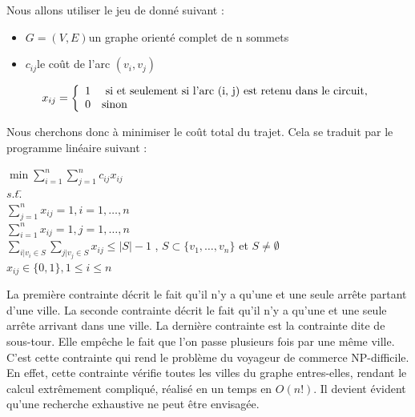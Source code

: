 \documentclass{article}
\begin{document}
Nous allons utiliser le jeu de donné suivant :\newline
\begin{itemize}
\item{$G = (V, E)$}{un graphe orienté complet de n sommets}
\item{$c_{ij}$}{le coût de l'arc $(v_{i}, v_{j})$}
\end{itemize}

\[ x_{ij} = \left\{
\begin{array}{l l}
	1 \quad $ si et seulement si l'arc (i, j) est retenu dans le circuit,$\\
	0 \quad $sinon$
\end{array} \right.\]

Nous cherchons donc à minimiser le coût total du trajet. Cela se traduit par le programme linéaire suivant :

\begin{tabbing}
$\min\sum_{i=1}^{n}\sum_{j=1}^{n}c_{ij}x_{ij}$\\
$s.t.$\=
\+\\
$\sum_{j=1}^{n}x_{ij} = 1, i = 1,\dots, n$\\
$\sum_{i=1}^{n}x_{ij} = 1, j = 1,\dots, n$\\
$\sum_{i|v_{i} \in S}\sum_{j|v_{j} \in S}x_{ij} \leq |S| - 1$ , $S \subset \{v_{1},\dots, v_{n}\}$ et $S \neq \emptyset$\\
$x_{ij} \in \{0,1\}, 1 \leq i \leq n$
\end{tabbing}

La première contrainte décrit le fait qu'il n'y a qu'une et une seule arrête partant d'une ville.
La seconde contrainte décrit le fait qu'il n'y a qu'une et une seule arrête arrivant dans une ville.
La dernière contrainte est la contrainte dite de sous-tour.
Elle empêche le fait que l'on passe plusieurs fois par une même ville.
C'est cette contrainte qui rend le problème du voyageur de commerce NP-difficile.
En effet, cette contrainte vérifie toutes les villes du graphe entres-elles, rendant le calcul extrêmement compliqué, réalisé en un temps en $O(n!)$.
Il devient évident qu'une recherche exhaustive ne peut être envisagée.
\end{document}
